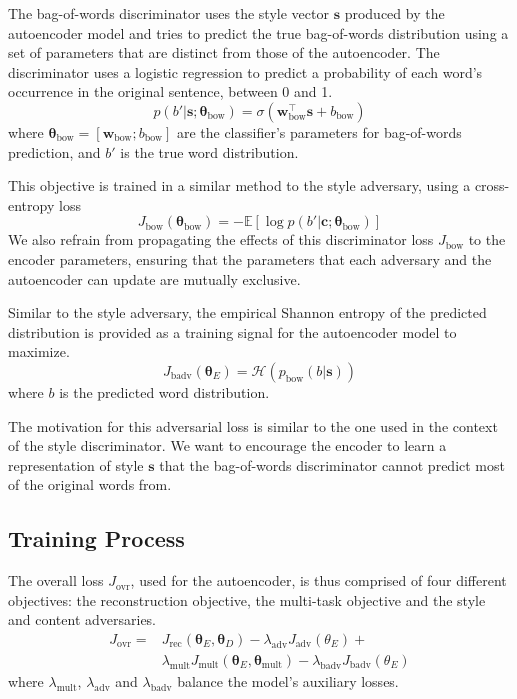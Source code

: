 \documentclass[11pt,a4paper]{article}
\newcommand{\loss}[1]{J_\text{#1}}
\begin{document}
The bag-of-words discriminator uses the style vector $\bm s$ produced by the autoencoder model and tries to predict the true bag-of-words distribution using a set of parameters that are distinct from those of the autoencoder. The discriminator uses a logistic regression to predict a probability of each word's occurrence in the original sentence, between 0 and 1.
\begin{equation}
	p(b' | \bm s; \bm\theta_\text{bow}) = \sigma(\bm w_\text{bow}^\top \bm s + b_\text{bow})
\end{equation}
where $\bm\theta_\text{bow}=[\bm w_\text{bow}; b_\text{bow}]$ are the classifier's parameters for bag-of-words prediction, and $b'$ is the true word distribution.

This objective is trained in a similar method to the style adversary, using a cross-entropy loss
\begin{equation} \label{eqn:adv-bow-disc-loss}
	\loss{bow}(\bm\theta_\text{bow}) =
	- \mathbb{E} [\log p(b' | \bm c; \bm\theta_\text{bow})]
\end{equation}
We also refrain from propagating the effects of this discriminator loss $\loss{bow}$ to the encoder parameters, ensuring that the parameters that each adversary and the autoencoder can update are mutually exclusive.

Similar to the style adversary, the empirical Shannon entropy of the predicted distribution is provided as a training signal for the autoencoder model to maximize.
\begin{equation}
	\loss{badv}(\bm\theta_E) = \mathcal{H}(p_\text{bow}(b | \bm s))
\end{equation}
where $b$ is the predicted word distribution.

The motivation for this adversarial loss is similar to the one used in the context of the style discriminator. We want to encourage the encoder to learn a representation of style $\bm s$ that the bag-of-words discriminator cannot predict most of the original words from.

\subsection{Training Process}

The overall loss $\loss{ovr}$, used for the autoencoder, is thus comprised of four different objectives: the reconstruction objective, the multi-task objective and the style and content adversaries.
\begin{align*}
	\loss{ovr} =
	 & \loss{rec}(\bm\theta_E, \bm\theta_D) - \lambda_\text{adv} \loss{adv}(\theta_E) +                                \\
	 & \lambda_\text{mult} \loss{mult} (\bm\theta_E,\bm\theta_\text{mult}) - \lambda_\text{badv} \loss{badv}(\theta_E)
\end{align*}
where $\lambda_\text{mult}$, $\lambda_\text{adv}$ and $\lambda_\text{badv}$ balance the model's auxiliary losses.
\end{document}
